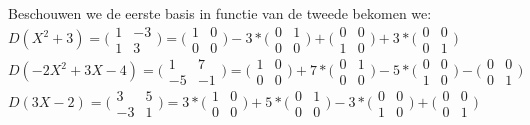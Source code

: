 \documentclass[lineaire_algebra_oplossingen.tex]{subfiles}
\begin{document}
Beschouwen we de eerste basis in functie van de tweede bekomen we:\\

$D(X^2+3) = \bigl(
\begin{smallmatrix}
1&-3\\ 1&3
\end{smallmatrix}
\bigr) = \bigl(
\begin{smallmatrix}
1&0\\ 0&0
\end{smallmatrix}
\bigr) -3* \bigl(
\begin{smallmatrix}
0&1\\ 0&0
\end{smallmatrix}
\bigr) + \bigl(
\begin{smallmatrix}
0&0\\ 1&0
\end{smallmatrix}
\bigr) +3* \bigl(
\begin{smallmatrix}
0&0\\ 0&1
\end{smallmatrix}
\bigr)$\\

$D(-2X^2+3X-4) = \bigl(
\begin{smallmatrix}
1&7\\ -5&-1
\end{smallmatrix}
\bigr) = \bigl(
\begin{smallmatrix}
1&0\\ 0&0
\end{smallmatrix}
\bigr) + 7* \bigl(
\begin{smallmatrix}
0&1\\ 0&0
\end{smallmatrix}
\bigr) - 5* \bigl(
\begin{smallmatrix}
0&0\\ 1&0
\end{smallmatrix}
\bigr) - \bigl(
\begin{smallmatrix}
0&0\\ 0&1
\end{smallmatrix}
\bigr)$\\

$D(3X-2) = \bigl(
\begin{smallmatrix}
3&5\\ -3&1
\end{smallmatrix}
\bigr) = 3* \bigl(
\begin{smallmatrix}
1&0\\ 0&0
\end{smallmatrix}
\bigr) + 5* \bigl(
\begin{smallmatrix}
0&1\\ 0&0
\end{smallmatrix}
\bigr) - 3* \bigl(
\begin{smallmatrix}
0&0\\ 1&0
\end{smallmatrix}
\bigr) + \bigl(
\begin{smallmatrix}
0&0\\ 0&1
\end{smallmatrix}
\bigr)$\\
\end{document}
